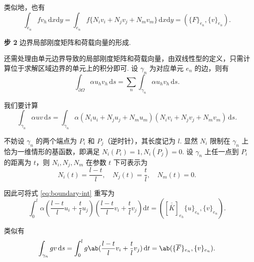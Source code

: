 类似地，也有
\begin{equation*}
\int_{e_n} f v_h \, \mathrm{d}x\mathrm{d}y = \int_{e_n} f\{N_i v_i + N_j v_j + N_m v_m\} \, \mathrm{d}x\mathrm{d}y = (\{F\}_{e_n}, \{v\}_{e_n}).
\end{equation*}

\textbf{步 2} 边界局部刚度矩阵和荷载向量的形成.\par
还需处理由单元边界导致的局部刚度矩阵和荷载向量，由双线性型的定义，只需计算位于求解区域边界的单元上的积分即可. 设 $\gamma_n$ 为对应单元 $e_n$ 的边，则有
\begin{equation*}
\int_{\partial\Omega} \alpha u_h v_h \, \mathrm{d}s = \sum_n \int_{\gamma_n} \alpha u_h v_h \, \mathrm{d}s.
\end{equation*}

我们要计算
\begin{equation}
\int_{\gamma_n} \alpha u v \, \mathrm{d}s = \int_{\gamma_n} \alpha (N_i u_i + N_j u_j + N_m u_m)(N_i v_i + N_j v_j + N_m v_m) \, \mathrm{d}s. \label{eq:boundary-int}
\end{equation}

不妨设 $\gamma_n$ 的两个端点为 $P_i$ 和 $P_j$（逆时针），其长度记为 $l$. 显然 $N_i$ 限制在 $\gamma_n$ 上恰为一维情形的基函数，即满足 $N_i(P_i) = 1, N_i(P_j) = 0$. 设 $\gamma_n$ 上任一点到 $P_i$ 的距离为 $t$，则 $N_i, N_j, N_m$ 在参数 $t$ 下可表示为
\begin{equation*}
N_i(t) = \frac{l-t}{l}, \quad N_j(t) = \frac{t}{l}, \quad N_m(t) = 0.
\end{equation*}

因此可将式 \eqref{eq:boundary-int} 重写为
\begin{equation*}
\int_0^l \alpha \left(\frac{l-t}{l}u_i + \frac{t}{l}u_j\right)\left(\frac{l-t}{l}v_i + \frac{t}{l}v_j\right) \mathrm{d}t = ([\overline{\overline{K}}]_{e_h}\{u\}_{e_n}, \{v\}_{e_n}).
\end{equation*}

类似有
\begin{equation*}
\int_{\gamma_n} gv\d s = \int_0^l g\ab(\frac{l-t}{l}v_i + \frac{t}{l}v_j)\d t =
\ab(\{\overline{F}\}_{e_n}, \{v\}_{e_n}).
\end{equation*}

